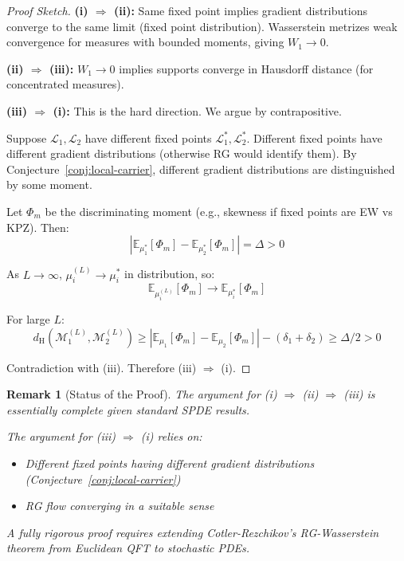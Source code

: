 \documentclass[11pt]{article}
\newtheorem{remark}{Remark}[section]
\newcommand{\E}{\mathbb{E}}
\newcommand{\calM}{\mathcal{M}}
\newcommand{\dH}{d_{\mathrm{H}}}
\begin{document}
\begin{proof}[Proof Sketch]
\textbf{(i) $\Rightarrow$ (ii):} Same fixed point implies gradient distributions converge to the same limit (fixed point distribution). Wasserstein metrizes weak convergence for measures with bounded moments, giving $W_1 \to 0$.

\textbf{(ii) $\Rightarrow$ (iii):} $W_1 \to 0$ implies supports converge in Hausdorff distance (for concentrated measures).

\textbf{(iii) $\Rightarrow$ (i):} This is the hard direction. We argue by contrapositive.

Suppose $\mathcal{L}_1, \mathcal{L}_2$ have different fixed points $\mathcal{L}_1^*, \mathcal{L}_2^*$. Different fixed points have different gradient distributions (otherwise RG would identify them). By Conjecture~\ref{conj:local-carrier}, different gradient distributions are distinguished by some moment.

Let $\Phi_m$ be the discriminating moment (e.g., skewness if fixed points are EW vs KPZ). Then:
\[
|\E_{\mu_1^*}[\Phi_m] - \E_{\mu_2^*}[\Phi_m]| = \Delta > 0
\]

As $L \to \infty$, $\mu_i^{(L)} \to \mu_i^*$ in distribution, so:
\[
\E_{\mu_i^{(L)}}[\Phi_m] \to \E_{\mu_i^*}[\Phi_m]
\]

For large $L$:
\[
\dH(\calM_1^{(L)}, \calM_2^{(L)}) \geq |\E_{\mu_1}[\Phi_m] - \E_{\mu_2}[\Phi_m]| - (\delta_1 + \delta_2) \geq \Delta/2 > 0
\]

Contradiction with (iii). Therefore (iii) $\Rightarrow$ (i).
\end{proof}

\begin{remark}[Status of the Proof]
The argument for (i) $\Rightarrow$ (ii) $\Rightarrow$ (iii) is essentially complete given standard SPDE results.

The argument for (iii) $\Rightarrow$ (i) relies on:
\begin{itemize}
\item Different fixed points having different gradient distributions (Conjecture~\ref{conj:local-carrier})
\item RG flow converging in a suitable sense
\end{itemize}

A fully rigorous proof requires extending Cotler-Rezchikov's RG-Wasserstein theorem from Euclidean QFT to stochastic PDEs.
\end{remark}

\end{document}
